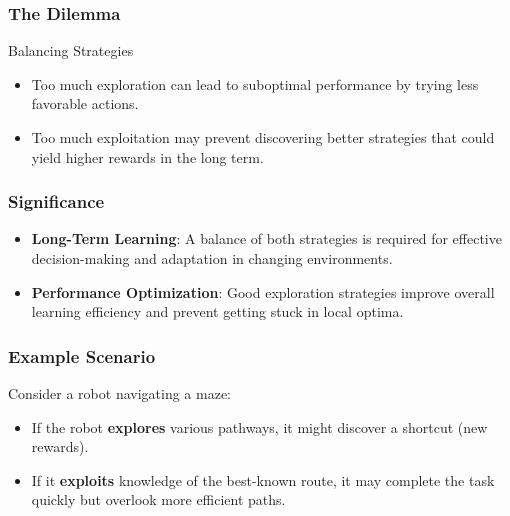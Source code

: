 \documentclass[aspectratio=169]{beamer}
\begin{document}
\begin{frame}[fragile]
    \frametitle{The Dilemma}
    \begin{block}{Balancing Strategies}
        \begin{itemize}
            \item Too much exploration can lead to suboptimal performance by trying less favorable actions.
            \item Too much exploitation may prevent discovering better strategies that could yield higher rewards in the long term.
        \end{itemize}
    \end{block}
\end{frame}

\begin{frame}[fragile]
    \frametitle{Significance}
    \begin{itemize}
        \item \textbf{Long-Term Learning}: A balance of both strategies is required for effective decision-making and adaptation in changing environments.
        \item \textbf{Performance Optimization}: Good exploration strategies improve overall learning efficiency and prevent getting stuck in local optima.
    \end{itemize}
\end{frame}

\begin{frame}[fragile]
    \frametitle{Example Scenario}
    Consider a robot navigating a maze:
    \begin{itemize}
        \item If the robot \textbf{explores} various pathways, it might discover a shortcut (new rewards).
        \item If it \textbf{exploits} knowledge of the best-known route, it may complete the task quickly but overlook more efficient paths.
    \end{itemize}
\end{frame}
\end{document}
